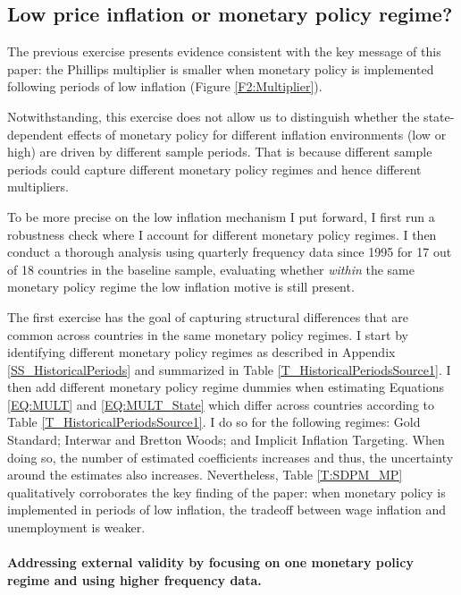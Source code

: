 \documentclass[12pt]{article}
\begin{document}
\subsection{Low price inflation or monetary policy regime?}

The previous exercise presents evidence consistent with the key message of this paper: the Phillips multiplier is smaller when monetary policy is implemented following periods of low inflation (Figure \ref{F2:Multiplier}).

Notwithstanding, this exercise does not allow us to distinguish whether the state-dependent effects of monetary policy for different inflation environments (low or high) are driven by different sample periods. That is because different sample periods could capture different monetary policy regimes and hence different multipliers.

To be more precise on the low inflation mechanism I put forward, I first run a robustness check where I account for different monetary policy regimes. I then conduct a thorough analysis using quarterly frequency data since 1995 for 17 out of 18 countries in the baseline sample, evaluating whether \textit{within} the same monetary policy regime the low inflation motive is still present.

The first exercise has the goal of capturing structural differences that are common across countries in the same monetary policy regimes. I start by identifying different monetary policy regimes as described in Appendix \ref{SS_HistoricalPeriods} and summarized in Table \ref{T_HistoricalPeriodsSource1}. I then add different monetary policy regime dummies when estimating Equations \eqref{EQ:MULT} and \eqref{EQ:MULT_State} which differ across countries according to Table \ref{T_HistoricalPeriodsSource1}. I do so for the following regimes: Gold Standard; Interwar and Bretton Woods; and Implicit Inflation Targeting. When doing so, the number of estimated coefficients increases and thus, the uncertainty around the estimates also increases. Nevertheless, Table \ref{T:SDPM_MP} qualitatively corroborates the key finding of the paper: when monetary policy is implemented in periods of low inflation, the tradeoff between wage inflation and unemployment is weaker.

\paragraph{Addressing external validity by focusing on one monetary policy regime and using higher frequency data.}
\end{document}
